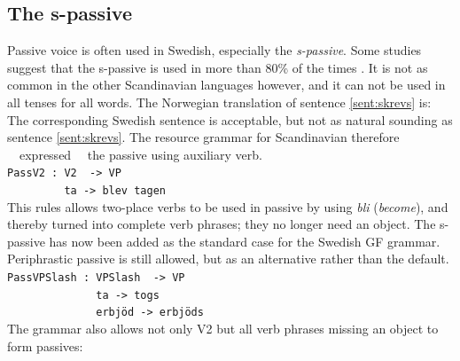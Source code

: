 \documentclass{report}
\begin{document}
\subsection{The s-passive}
Passive voice is often used in Swedish, especially the
\textit{s-passive}.
\label{sent:skrevs}
Some studies suggest that the s-passive is used in more than 80\% of the times \cite{laanemets}.
It is not as common in the other Scandinavian languages however, 
and it can not be used in all tenses for all words. The Norwegian 
translation of sentence \ref{sent:skrevs} is:
The corresponding Swedish sentence is acceptable, but not as natural sounding as sentence
\ref{sent:skrevs}.
The resource grammar for Scandinavian therefore ~~expressed~~ the passive using auxiliary verb. \\
\verb|PassV2 : V2  -> VP | \\
\verb|         ta -> blev tagen| \\
This rules allows two-place verbs to be used in passive by using \emph{bli} (\emph{become}), and thereby
turned into complete verb phrases; they no longer need an object.
The s-passive has now been added as the standard case for the Swedish GF
grammar. Periphrastic passive is still allowed, but as an alternative rather
than the default.
\verb|PassVPSlash : VPSlash  -> VP | \\
\verb|              ta -> togs| \\
\verb|              erbjöd -> erbjöds| \\
The grammar also allows not only V2 but all verb phrases missing an object to 
form passives:
\label{ex:passV32}
\label{ex:passV33}
\label{ex:passV2A}
\end{document}
